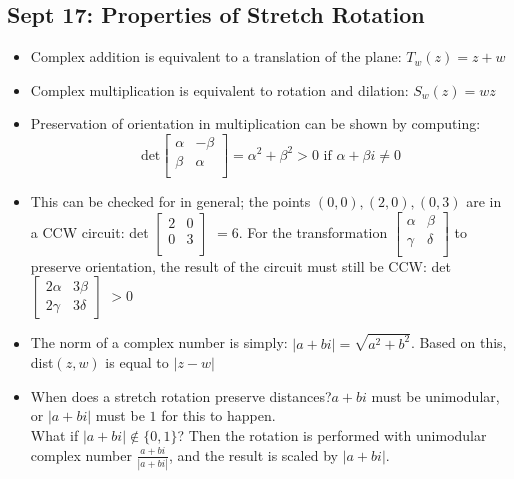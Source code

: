 \documentclass[10pt, oneside]{article}
\begin{document}
\subsection{Sept 17: Properties of Stretch Rotation}
\begin{itemize}
    \item Complex addition is equivalent to a translation of the plane: $T_w (z) = z+w$ 
    \item Complex multiplication is equivalent to rotation and dilation: $S_w (z) = wz$
    \item Preservation of orientation in multiplication can be shown by computing:\\
        \[\text{det}
        \begin{bmatrix}
            \alpha & -\beta\\
            \beta & \alpha\\ 
        \end{bmatrix}
        = \alpha^2 + \beta^2 > 0 \text{  if  } \alpha + \beta i  \neq 0\]
    \item This can be checked for in general; the points $(0,0),(2,0),(0,3)$ are in a CCW circuit: det 
    $\begin{bmatrix}
        2 & 0\\
        0 & 3\\
    \end{bmatrix}$
    $= 6$.
    For the transformation 
    $\begin{bmatrix}
        \alpha & \beta \\
        \gamma & \delta\\
    \end{bmatrix}$
    to preserve orientation, the result of the circuit must still be CCW: det
    $\begin{bmatrix}
        2\alpha & 3\beta \\
        2\gamma & 3\delta
    \end{bmatrix}$
    $> 0$
    \item The norm of a complex number is simply: $|a + bi| = \sqrt{a^2 + b^2}$.
    Based on this, dist$(z,w)$ is equal to $|z-w|$
    \item When does a stretch rotation preserve distances?$a + bi$ must be unimodular, or $|a + bi|$ must be $1$ for this to happen.\\
    What if $|a + bi| \notin \{0,1\}$? Then the rotation is performed with unimodular complex number $\frac{a + bi}{|a + bi|}$, and the result is scaled by $|a + bi|$.
\end{itemize}
\end{document}
